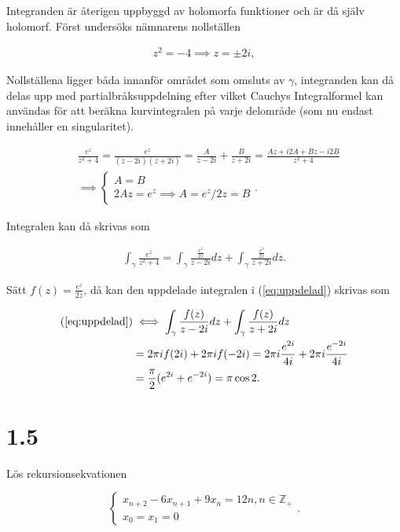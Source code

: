 \documentclass[a4paper]{article}
\begin{document}
Integranden är återigen uppbyggd av holomorfa funktioner och är då själv holomorf. Först undersöks nämnarens nollställen

\begin{align*}
	z^2 = -4 \implies z = \pm 2i,
\end{align*}

Nollställena ligger båda innanför området som omsluts av $\gamma$, integranden kan då delas upp med partialbråksuppdelning efter vilket Cauchys Integralformel kan användas för att beräkna kurvintegralen på varje delområde (som nu endast innehåller en singularitet).

\begin{align*}
	&\frac{e^z}{z^2 + 4} = \frac{e^z}{(z-2i)(z+2i)} = \frac{A}{z-2i} + \frac{B}{z+2i} = \frac{Az + i2A + Bz - i2B}{z^2 + 4}\\
	&\implies	\begin{cases}
					A = B\\
					2Az = e^z \implies A = e^z/2z = B
				\end{cases}.
\end{align*}

Integralen kan då skrivas som

\begin{align}
	\int_\gamma \frac{e^z}{z^2 + 4} = \int_\gamma \frac{\frac{e^z}{2z}}{z-2i}dz + \int_\gamma \frac{\frac{e^z}{2z}}{z+2i}dz.\label{eq:uppdelad}
\end{align}

Sätt $f(z) = \frac{e^z}{2z}$, då kan den uppdelade integralen i (\ref{eq:uppdelad}) skrivas som

\begin{align*}
	(\ref{eq:uppdelad}) &\iff \int_\gamma \frac{f(z)}{z-2i}dz + \int_\gamma \frac{f(z)}{z+2i}dz\\
		&= 2\pi i f(2i) + 2\pi i f(-2i) = 2\pi i \frac{e^{2i}}{4i} + 2\pi i \frac{e^{-2i}}{4i}\\
		&= \frac{\pi}{2}(e^{2i} + e^{-2i}) = \pi\cos 2.
\end{align*}

\section*{1.5}

Lös rekursionsekvationen

\begin{equation}
	\begin{cases}
		x_{n+2} - 6x_{n+1} + 9x_n = 12n, n \in \mathbb{Z}_+\\
		x_0 = x_1 = 0
	\end{cases}\label{eq:rek_ekv_1}.
\end{equation}
\end{document}
